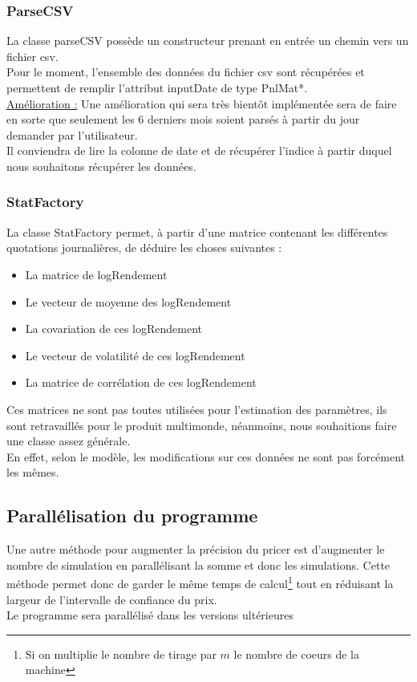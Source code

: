 \documentclass[a4paper,12pt]{article}
\begin{document}
\subsubsection{ParseCSV}
La classe parseCSV possède un constructeur prenant en entrée un chemin vers un fichier csv. \\
Pour le moment, l'ensemble des données du fichier csv sont récupérées et permettent de remplir l'attribut inputDate de type PnlMat*.\\
\underline{Amélioration :} Une amélioration qui sera très bientôt implémentée sera de faire en sorte que seulement les 6 derniers mois soient parsés à partir du jour demander par l'utilisateur. \\ 
Il conviendra de lire la colonne de date et de récupérer l'indice à partir duquel nous souhaitons récupérer les données. 

\subsubsection{StatFactory}

La classe StatFactory permet, à partir d'une matrice contenant les différentes quotations journalières, de déduire les choses suivantes : 
\begin{itemize}
    \item La matrice de logRendement 
    \item Le vecteur de moyenne des logRendement
    \item La covariation de ces logRendement 
    \item Le vecteur de volatilité de ces logRendement 
    \item La matrice de corrélation de ces logRendement
\end{itemize}

Ces matrices ne sont pas toutes utilisées pour l'estimation des paramètres, ils sont retravaillés pour le produit multimonde, néanmoins, nous souhaitions faire une classe assez générale. \\ 
En effet, selon le modèle, les modifications sur ces données ne sont pas forcément les mêmes. 

\subsection{Parallélisation du programme}
Une autre méthode pour augmenter la précision du pricer est d'augmenter le nombre de simulation en parallélisant la somme et donc les simulations. Cette méthode permet donc de garder le même temps de calcul\footnote{Si on multiplie le nombre de tirage par $m$ le nombre de coeurs de la machine} tout en réduisant la largeur de l'intervalle de confiance du prix. \\
Le programme sera parallélisé dans les versions ultérieures
\end{document}
